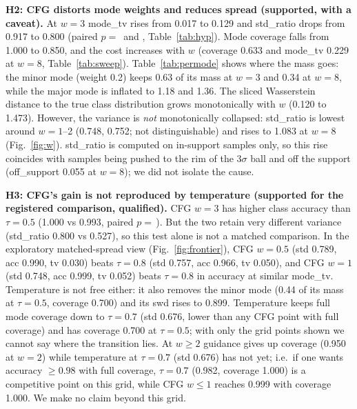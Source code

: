 \textbf{H2: CFG distorts mode weights and reduces spread (supported, with a caveat).} At $w=3$ mode\_tv rises from 0.017 to 0.129 and std\_ratio drops from 0.917 to 0.800 (paired $p=$\, and , Table~\ref{tab:hyp}). Mode coverage falls from 1.000 to 0.850, and the cost increases with $w$ (coverage 0.633 and mode\_tv 0.229 at $w=8$, Table~\ref{tab:sweep}). Table~\ref{tab:permode} shows where the mass goes: the minor mode (weight 0.2) keeps 0.63 of its mass at $w=3$ and 0.34 at $w=8$, while the major mode is inflated to 1.18 and 1.36. The sliced Wasserstein distance to the true class distribution grows monotonically with $w$ (0.120 to 1.473). However, the variance is \emph{not} monotonically collapsed: std\_ratio is lowest around $w=1$--2 (0.748, 0.752; not distinguishable) and rises to 1.083 at $w=8$ (Fig.~\ref{fig:w}). std\_ratio is computed on in-support samples only, so this rise coincides with samples being pushed to the rim of the $3\sigma$ ball and off the support (off\_support 0.055 at $w=8$); we did not isolate the cause.

\textbf{H3: CFG's gain is not reproduced by temperature (supported for the registered comparison, qualified).} CFG $w=3$ has higher class accuracy than $\tau=0.5$ (1.000 vs 0.993, paired $p=$\,). But the two retain very different variance (std\_ratio 0.800 vs 0.527), so this test alone is not a matched comparison. In the exploratory matched-spread view (Fig.~\ref{fig:frontier}), CFG $w=0.5$ (std 0.789, acc 0.990, tv 0.030) beats $\tau=0.8$ (std 0.757, acc 0.966, tv 0.050), and CFG $w=1$ (std 0.748, acc 0.999, tv 0.052) beats $\tau=0.8$ in accuracy at similar mode\_tv. Temperature is not free either: it also removes the minor mode (0.44 of its mass at $\tau=0.5$, coverage 0.700) and its swd rises to 0.899. Temperature keeps full mode coverage down to $\tau=0.7$ (std 0.676, lower than any CFG point with full coverage) and has coverage 0.700 at $\tau=0.5$; with only the grid points shown we cannot say where the transition lies. At $w\ge2$ guidance gives up coverage (0.950 at $w=2$) while temperature at $\tau=0.7$ (std 0.676) has not yet; i.e.\ if one wants accuracy $\ge0.98$ with full coverage, $\tau=0.7$ (0.982, coverage 1.000) is a competitive point on this grid, while CFG $w\le1$ reaches 0.999 with coverage 1.000. We make no claim beyond this grid.

